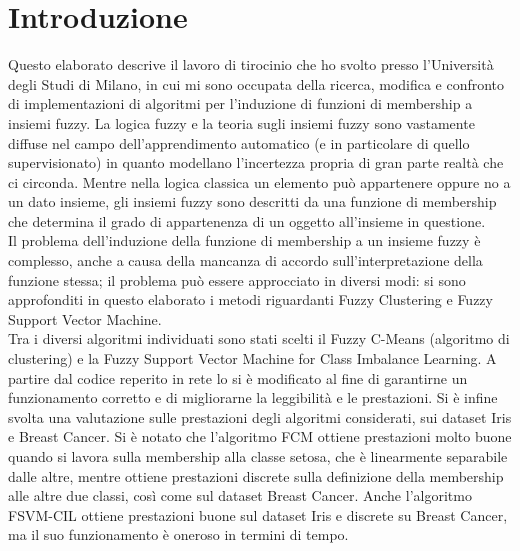\documentclass[oneside, openany]{book}
\begin{document}
	\chapter*{Introduzione}
		{} 
		Questo elaborato descrive il lavoro di tirocinio che ho svolto presso l'Università degli Studi di Milano, in cui mi sono occupata della ricerca, modifica e confronto di implementazioni di algoritmi per l'induzione di funzioni di membership a insiemi fuzzy. La logica fuzzy e la teoria sugli insiemi fuzzy sono vastamente diffuse nel campo dell'apprendimento automatico (e in particolare di quello supervisionato) in quanto modellano l'incertezza propria di gran parte realtà che ci circonda. Mentre nella logica classica un elemento può appartenere oppure no a un dato insieme, gli insiemi fuzzy sono descritti da una funzione di membership che determina il grado di appartenenza di un oggetto all'insieme in questione.\\
		Il problema dell'induzione della funzione di membership a un insieme fuzzy è complesso, anche a causa della mancanza di accordo sull'interpretazione della funzione stessa; il problema può essere approcciato in diversi modi: si sono approfonditi in questo elaborato i metodi riguardanti Fuzzy Clustering e Fuzzy Support Vector Machine.\\
		Tra i diversi algoritmi individuati sono stati scelti il Fuzzy C-Means (algoritmo di clustering) e la Fuzzy Support Vector Machine for Class Imbalance Learning. A partire dal codice reperito in rete lo si è modificato al fine di garantirne un funzionamento corretto e di migliorarne la leggibilità e le prestazioni. Si è infine svolta una valutazione sulle prestazioni degli algoritmi considerati, sui dataset Iris e Breast Cancer. Si è notato che l'algoritmo FCM ottiene prestazioni molto buone quando si lavora sulla membership alla classe setosa, che è linearmente separabile dalle altre, mentre ottiene prestazioni discrete sulla definizione della membership alle altre due classi, così come sul dataset Breast Cancer. Anche l'algoritmo FSVM-CIL ottiene prestazioni buone sul dataset Iris e discrete su Breast Cancer, ma il suo funzionamento è oneroso in termini di tempo.
		
\end{document}
